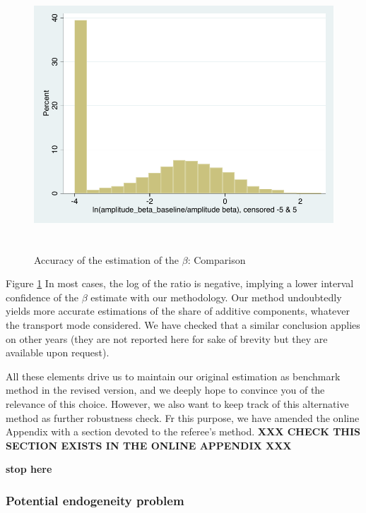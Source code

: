 \documentclass[a4paper,12pt]{article}
\begin{document}
\begin{itemize}
\begin{itemize}
\begin{figure}[htbp]
\caption{Accuracy of the estimation of the $\beta$: Comparison}
\label{fig:accuracy_beta}
\begin{center}
\includegraphics[height=4in]{accuracy_beta.pdf}
\end{center}
\end{figure}

Figure \ref{fig:accuracy_beta} In most cases, the log of the ratio is negative, implying a lower interval confidence of the $\beta$ estimate with our methodology. Our method undoubtedly yields more accurate estimations of the share of additive components, whatever the transport mode considered. We have checked that a similar conclusion applies on other years (they are not reported here for sake of brevity but they are available upon request).

\end{itemize}
\end{itemize}

All these elements drive us to maintain our original estimation as benchmark method in the revised version, and we deeply hope to convince you of the relevance of this choice. However, we also want to keep track of this alternative method as further robustness check. Fr this purpose, we have amended the online Appendix with a section devoted to the referee's method.\textbf{ XXX CHECK THIS SECTION EXISTS IN THE ONLINE APPENDIX XXX}

\textbf{stop here}



\subsubsection{Potential endogeneity problem}
\end{document}

